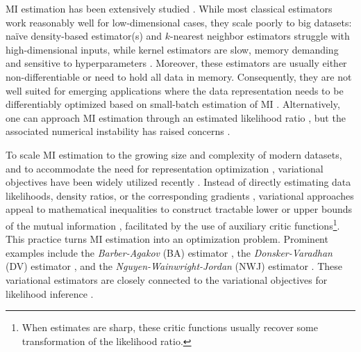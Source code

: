 \documentclass{article}
\theoremstyle{plain}
\theoremstyle{definition}
\theoremstyle{remark}
\begin{document}
	MI estimation has been extensively studied \citep{battiti1994using, maes1997multimodality, mackay2003information, paninski2003estimation, pluim2003mutual, torkkola2003feature}. While most classical estimators work reasonably well for low-dimensional cases, they scale poorly to big datasets: 
	na\"ive density-based estimator(s) and $k$-nearest neighbor estimators \citep{kraskov2004estimating, perez2008estimation, gao2015efficient} struggle with high-dimensional inputs, while kernel estimators are slow, memory demanding and sensitive to hyperparameters \citep{gretton2003kernel, gretton2005kernel}. Moreover, these estimators are usually either non-differentiable or need to hold all data in memory. Consequently, they are not well suited for emerging applications where the data representation needs to be differentiably optimized based on small-batch estimation of MI \citep{hjelm2019learning}. Alternatively, one can approach MI estimation through an estimated likelihood ratio \citep{suzuki2008approximating, hjelm2019learning}, but the associated numerical instability has raised concerns \citep{arjovsky2017towards}. 
	
	
	To scale MI estimation to the growing size and complexity of modern datasets, and to accommodate the need for representation optimization \citep{bengio2013representation}, variational objectives have been widely utilized recently \citep{oord2018representation}. Instead of directly estimating data likelihoods, density ratios, or the corresponding gradients \citep{wen2020mutual}, variational approaches appeal to mathematical inequalities to construct tractable lower or upper bounds of the mutual information \citep{poole2019variational}, facilitated by the use of auxiliary critic functions\footnote{When estimates are sharp, these critic functions usually recover some transformation of the likelihood ratio.}. This practice turns MI estimation into an optimization problem. Prominent examples include the {\it Barber-Agakov} (BA) estimator \citep{agakov2004algorithm},  the {\it Donsker-Varadhan} (DV) estimator \citep{donsker1983asymptotic}, and the {\it Nguyen-Wainwright-Jordan} (NWJ) estimator \citep{nguyen2010estimating}. These variational estimators are closely connected to the variational objectives for likelihood inference \citep{alemi2018fixing}.
	
\end{document}

